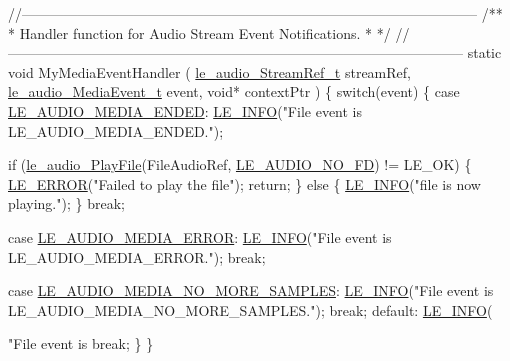 \begin{DoxyCodeInclude}
{{\textcolor{comment}{//--------------------------------------------------------------------------------------------------}\textcolor{comment}{}
\textcolor{comment}{/**}
\textcolor{comment}{ * Handler function for Audio Stream Event Notifications.}
\textcolor{comment}{ *}
\textcolor{comment}{ */}
\textcolor{comment}{//--------------------------------------------------------------------------------------------------}
\textcolor{keyword}{static} \textcolor{keywordtype}{void} MyMediaEventHandler
(
    \hyperlink{le__audio__interface_8h_a9a46ff5a5afa61f1bc76120ab9e4da0a}{le\_audio\_StreamRef\_t}          streamRef,
    \hyperlink{le__audio__interface_8h_aaf870f5f30f4f6f65efb873c5d0cb5f1}{le\_audio\_MediaEvent\_t}          event,
    \textcolor{keywordtype}{void}*                         contextPtr
)
\{
    \textcolor{keywordflow}{switch}(event)
    \{
        \textcolor{keywordflow}{case} \hyperlink{le__audio__interface_8h_aaf870f5f30f4f6f65efb873c5d0cb5f1a7dbc0c9a2c3839d3db974c5aa5be344d}{LE\_AUDIO\_MEDIA\_ENDED}:
            \hyperlink{le__log_8h_a23e6d206faa64f612045d688cdde5808}{LE\_INFO}(\textcolor{stringliteral}{"File event is LE\_AUDIO\_MEDIA\_ENDED."});

            \textcolor{keywordflow}{if} (\hyperlink{le__audio__interface_8h_aea2c5d0b394cfab87503639c534300c9}{le\_audio\_PlayFile}(FileAudioRef, \hyperlink{le__audio__interface_8h_a374c2f62ec5b8a92dd1de6fcb449fafe}{LE\_AUDIO\_NO\_FD}) != LE\_OK)
            \{
                \hyperlink{le__log_8h_a353590f91b3143a7ba3a416ae5a50c3d}{LE\_ERROR}(\textcolor{stringliteral}{"Failed to play the file"});
                \textcolor{keywordflow}{return};
            \}
            \textcolor{keywordflow}{else}
            \{
                \hyperlink{le__log_8h_a23e6d206faa64f612045d688cdde5808}{LE\_INFO}(\textcolor{stringliteral}{"file is now playing."});
            \}
            \textcolor{keywordflow}{break};

        \textcolor{keywordflow}{case} \hyperlink{le__audio__interface_8h_aaf870f5f30f4f6f65efb873c5d0cb5f1a5f7de6714ea54f09d036a87dd1c63a50}{LE\_AUDIO\_MEDIA\_ERROR}:
            \hyperlink{le__log_8h_a23e6d206faa64f612045d688cdde5808}{LE\_INFO}(\textcolor{stringliteral}{"File event is LE\_AUDIO\_MEDIA\_ERROR."});
            \textcolor{keywordflow}{break};

        \textcolor{keywordflow}{case} \hyperlink{le__audio__interface_8h_aaf870f5f30f4f6f65efb873c5d0cb5f1a06883432159e9e69637fbe5eefd59159}{LE\_AUDIO\_MEDIA\_NO\_MORE\_SAMPLES}:
            \hyperlink{le__log_8h_a23e6d206faa64f612045d688cdde5808}{LE\_INFO}(\textcolor{stringliteral}{"File event is LE\_AUDIO\_MEDIA\_NO\_MORE\_SAMPLES."});
        \textcolor{keywordflow}{break};
        \textcolor{keywordflow}{default}:
            \hyperlink{le__log_8h_a23e6d206faa64f612045d688cdde5808}{LE\_INFO}(\textcolor{stringliteral}{"File event is %
        \textcolor{keywordflow}{break};
    \}
\}


}}}
\end{DoxyCodeInclude}
